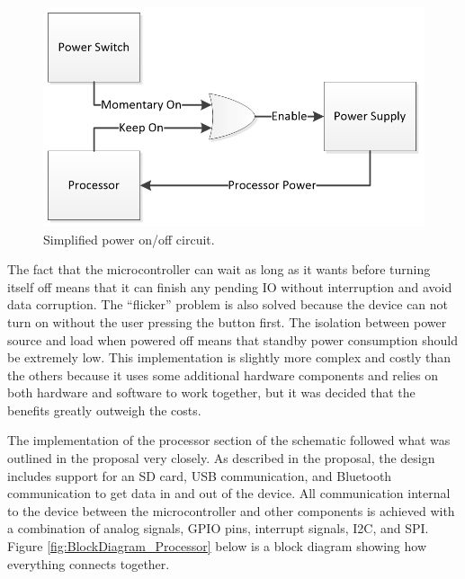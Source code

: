 \begin{figure}[!htb]
\centering
\includegraphics[width=\textwidth]{images/BlockDiagram_OnOff.png}
\caption{Simplified power on/off circuit.}
\label{fig:BlockDiagram_OnOff}
\end{figure}

The fact that the microcontroller can wait as long as it wants before turning 
itself off means that it can finish any pending IO without interruption and 
avoid data corruption. The “flicker” problem is also solved because the device 
can not turn on without the user pressing the button first. The isolation 
between power source and load when powered off means that standby power 
consumption should be extremely low. This implementation is slightly more 
complex and costly than the others because it uses some additional hardware 
components and relies on both hardware and software to work together, but it 
was decided that the benefits greatly outweigh the costs.

The implementation of the processor section of the schematic followed what was 
outlined in the proposal very closely. As described in 
the proposal, the design includes support for an SD card, USB communication, 
and Bluetooth communication to get data in and out of the device. All 
communication internal to the device between the microcontroller and other 
components is achieved with a combination of analog signals, GPIO pins, 
interrupt signals, I2C, and SPI. Figure \ref{fig:BlockDiagram_Processor} below 
is a block diagram showing how everything connects together.

